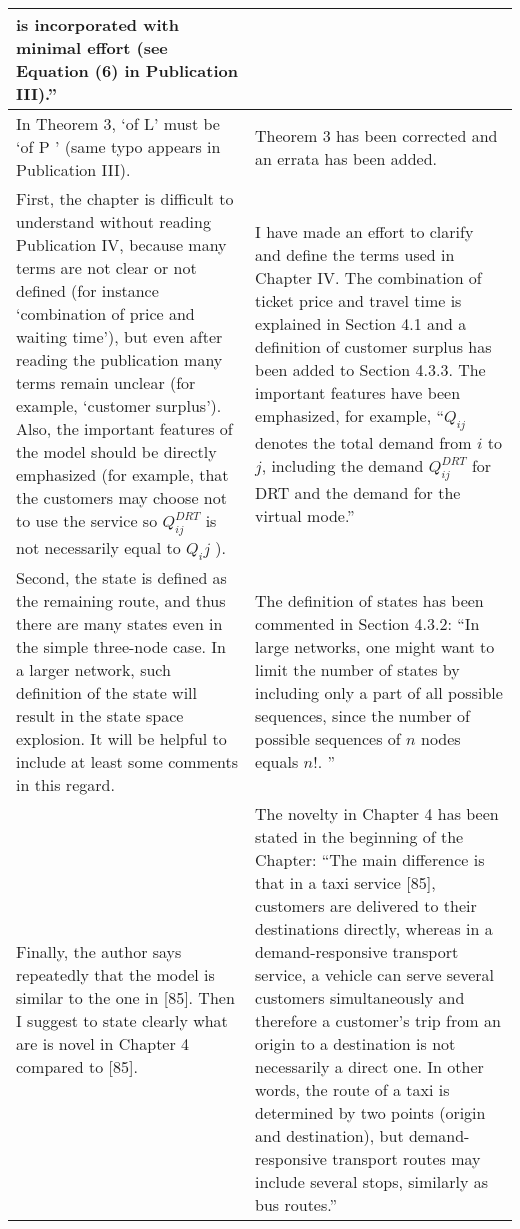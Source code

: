 \documentclass[a4paper,12pt]{article}
\begin{document}
\begin{longtable}{|p{}|p{}|}
is incorporated with minimal effort (see Equation (6) in Publication III).''
\\ \hline
In Theorem 3, ‘of L’ must be ‘of P ’ (same typo appears in
Publication III).
& 
Theorem 3 has been corrected and an errata has been added.
\\ \hline
First, the chapter is difficult to understand without reading Publication IV, because many terms 
are not clear or not defined (for instance ‘combination of price and
waiting time’), but even after reading the publication many terms remain unclear (for example,
‘customer surplus’). Also, the important features of the model should be directly emphasized (for
example, that the customers may choose not to use the service so $Q_{ij}^{DRT}$ is not necessarily 
equal to $Q_ij$ ). 
& 
I have made an effort to clarify and define the terms used in Chapter IV. The combination of ticket price and travel time
is explained in Section 4.1 and a definition of customer surplus has been added to Section 4.3.3.
The important features have been emphasized, for example, 
``$Q_{ij}$ denotes the total demand from $i$ to $j$, including the demand $Q_{ij}^{DRT}$ for DRT and the demand for the virtual mode.''
\\ \hline
Second, the state is defined as the remaining route, and thus there are many states even
in the simple three-node case. In a larger network, such definition of the state will result in the
state space explosion. It will be helpful to include at least some comments in this regard. 
& 
The definition of states has been commented in Section 4.3.2:
``In large networks, one might want to
limit the number of states by including only a part of all 
possible sequences, since the number of possible sequences of $n$ nodes equals $n!$. ''
\\ \hline
Finally,
the author says repeatedly that the model is similar to the one in [85]. Then I suggest to state
clearly what are is novel in Chapter 4 compared to [85].
& 
The novelty in Chapter 4 has been stated in the beginning of the Chapter:
``The main difference is that in a taxi service [85], 
customers are delivered to their destinations directly, whereas in a demand-responsive transport service, a vehicle can serve several customers 
simultaneously and therefore a customer's trip from an origin to a destination is not necessarily a direct one. 
In other words, the route of a taxi is determined by two points (origin and destination), but 
demand-responsive transport routes may include several stops, similarly as bus routes.''


\end{longtable}
\end{document}

